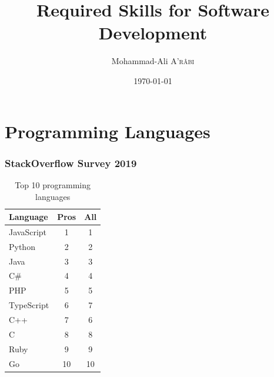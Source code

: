 \documentclass[10pt, compress]{beamer}
\title{Required Skills for Software Development}
\subtitle{}
\date{\today}
\author{Mohammad-Ali \textsc{A'r\^abi}}
\institute{Albert-Ludwigs-Universität Freiburg}
\begin{document}
\maketitle

\section{Programming Languages}

\begin{frame}[fragile]
    \frametitle{StackOverflow Survey 2019}
  
    \begin{table}[c]
        \centering
        \begin{tabular}{l|cc}
            Language & Pros & All \\
            \hline
            JavaScript & 1 & 1 \\
            Python & 2 & 2 \\
            Java & 3 & 3 \\
            C\# & 4 & 4 \\
            PHP & 5 & 5 \\
            TypeScript & 6 & 7 \\
            C++ & 7 & 6 \\
            C & 8 & 8 \\
            Ruby & 9 & 9 \\
            Go & 10 & 10
        \end{tabular}
        \caption{Top 10 programming languages}
        \label{tab:stackoverflow-top-10}
    \end{table}

\end{frame}
\end{document}
